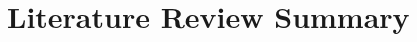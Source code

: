 \documentclass[numbered,pdftex]{ohio-etd}
\begin{document}
\section{Literature Review Summary}






























%
%
%
%
%
\end{document}
